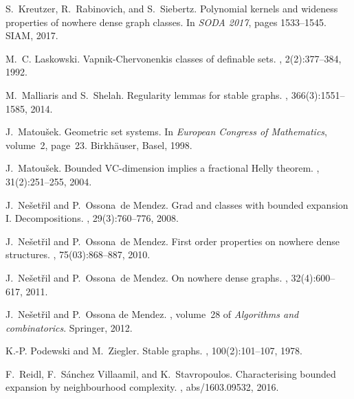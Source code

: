 \documentclass[11pt, fleqn]{article}
\theoremstyle{plain}
\theoremstyle{nonumberplain}
\begin{document}
\begin{thebibliography}{10}
S.~Kreutzer, R.~Rabinovich, and S.~Siebertz.
\newblock Polynomial kernels and wideness properties of nowhere dense graph
  classes.
\newblock In {\em {SODA 2017}}, pages 1533--1545. {SIAM}, 2017.

M.~C. Laskowski.
\newblock Vapnik-{C}hervonenkis classes of definable sets.
, 2(2):377--384,
  1992.

M.~Malliaris and S.~Shelah.
\newblock Regularity lemmas for stable graphs.
,
  366(3):1551--1585, 2014.

J.~Matou{\v{s}}ek.
\newblock Geometric set systems.
\newblock In {\em European Congress of Mathematics}, volume~2, page~23.
  Birkh{\"a}user, Basel, 1998.

J.~Matou{\v{s}}ek.
\newblock Bounded {VC}-dimension implies a fractional {H}elly theorem.
, 31(2):251--255, 2004.

J.~Ne{\v{s}}et{\v{r}}il and P.~Ossona~de Mendez.
\newblock Grad and classes with bounded expansion {I}. {D}ecompositions.
, 29(3):760--776, 2008.

J.~Ne{\v{s}}et{\v{r}}il and P.~Ossona~de Mendez.
\newblock First order properties on nowhere dense structures.
, 75(03):868--887, 2010.

J.~Ne{\v{s}}et{\v{r}}il and P.~Ossona~de Mendez.
\newblock On nowhere dense graphs.
, 32(4):600--617, 2011.

J.~Ne\v{s}et\v{r}il and P.~{Ossona de Mendez}.
,
  volume~28 of {\em Algorithms and combinatorics}.
\newblock Springer, 2012.

K.-P. Podewski and M.~Ziegler.
\newblock Stable graphs.
, 100(2):101--107, 1978.

F.~Reidl, F.~{S{\'{a}}nchez Villaamil}, and K.~Stavropoulos.
\newblock Characterising bounded expansion by neighbourhood complexity.
, abs/1603.09532, 2016.


\end{thebibliography}
\end{document}
